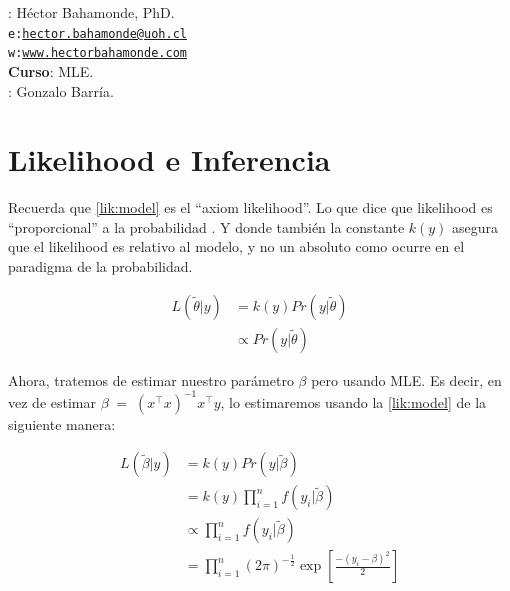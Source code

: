 \documentclass[onesided]{article}\usepackage[]{graphicx}\usepackage[]{color}
\begin{document}











\hspace{-5mm}{\bf Profesor}: H\'ector Bahamonde, PhD.\\
\texttt{e:}\href{mailto:hector.bahamonde@uoh.cl}{\texttt{hector.bahamonde@uoh.cl}}\\
\texttt{w:}\href{http://www.hectorbahamonde.com}{\texttt{www.hectorbahamonde.com}}\\
{\bf Curso}: MLE.\\
\hspace{-5mm}{\bf TA}: Gonzalo Barr\'ia.


\section{Likelihood e Inferencia}

Recuerda que \autoref{lik:model} es el ``axiom likelihood''. Lo que dice que likelihood es ``proporcional'' a la probabilidad \parencite[59]{King1998}. Y donde tambi\'en la constante $k(y)$ asegura que el likelihood es relativo al modelo, y no un absoluto como ocurre en el paradigma de la probabilidad.


\begin{equation} \label{lik:model}
\begin{split}
L(\tilde{\theta}|y) & =  k(y)Pr(y|\tilde{\theta})\\
& \propto Pr(y|\tilde{\theta})
\end{split}
\end{equation}


Ahora, tratemos de estimar nuestro par\'ametro $\beta$ pero usando MLE. Es decir, en vez de estimar $\beta \;=\; (x^{\top}x)^{-1}x^{\top}y$, lo estimaremos usando la \autoref{lik:model} de la siguiente manera:


\begin{equation} \label{lik:beta}
\begin{split}
L(\tilde{\beta}|y) & = k(y)Pr(y|\tilde{\beta})\\
                   & = k(y) \prod_{i=1}^{n} f(y_{i}|\tilde{\beta})\\
                   & \propto \prod_{i=1}^{n} f(y_{i}|\tilde{\beta})\\
                   & = \prod_{i=1}^{n} (2\pi)^{-\frac{1}{2}} \exp\left[ \frac{-(y_{i}-\beta)^{2}}{2} \right]
\end{split}
\end{equation}
\end{document}

